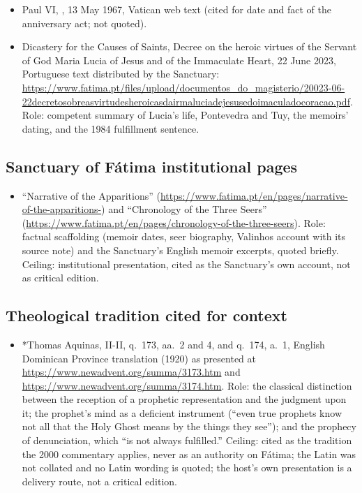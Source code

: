 \begin{itemize}
connection with alleged supernatural phenomena. The note does not
name F\'atima and is cited only for that general safeguard.
\item Paul VI, , 13 May 1967, Vatican web text
(cited for date and fact of the anniversary act; not quoted).
\item Dicastery for the Causes of Saints, Decree on the heroic
virtues of the Servant of God Maria Lucia of Jesus and of the
Immaculate Heart, 22 June 2023, Portuguese text distributed by the
Sanctuary:
\url{https://www.fatima.pt/files/upload/documentos_do_magisterio/20023-06-22decretosobreasvirtudesheroicasdairmaluciadejesusedoimaculadocoracao.pdf}.
Role: competent summary of Lucia's life, Pontevedra and Tuy, the
memoirs' dating, and the 1984 fulfillment sentence.
\end{itemize}

\subsection*{Sanctuary of F\'atima institutional pages}

\begin{itemize}
\item ``Narrative of the Apparitions''
(\url{https://www.fatima.pt/en/pages/narrative-of-the-apparitions-})
and ``Chronology of the Three Seers''
(\url{https://www.fatima.pt/en/pages/chronology-of-the-three-seers}).
Role: factual scaffolding (memoir dates, seer biography, Valinhos
account with its source note) and the Sanctuary's English memoir
excerpts, quoted briefly. Ceiling: institutional presentation, cited
as the Sanctuary's own account, not as critical edition.
\end{itemize}

\subsection*{Theological tradition cited for context}

\begin{itemize}
\item *Thomas Aquinas,  II-II, q.~173, aa.~2
and 4, and q.~174, a.~1, English Dominican Province translation
(1920) as presented at \url{https://www.newadvent.org/summa/3173.htm}
and \url{https://www.newadvent.org/summa/3174.htm}. Role: the
classical distinction between the reception of a prophetic
representation and the judgment upon it; the prophet's mind as a
deficient instrument (``even true prophets know not all that the Holy
Ghost means by the things they see''); and the prophecy of
denunciation, which ``is not always fulfilled.'' Ceiling: cited as
the tradition the 2000 commentary applies, never as an authority on
F\'atima; the Latin was not collated and no Latin wording is quoted;
the host's own presentation is a delivery route, not a critical
edition.
\end{itemize}

